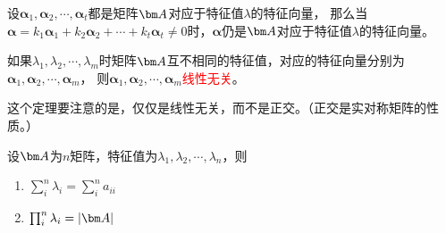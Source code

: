 \begin{theorem}
    设$\bm{\alpha}_1,\bm{\alpha}_2,\cdots,\bm{\alpha}_t$都是矩阵$\mat{A}$对应于特征值$\lambda$的特征向量，
    那么当$\bm{\alpha} = k_1\bm{\alpha}_1+k_2\bm{\alpha}_2 + \cdots + k_t\bm{\alpha}_t \neq 0$时，$\bm{\alpha}$仍是$\mat{A}$对应于特征值$\lambda$的特征向量。
\end{theorem}

\begin{theorem}
    如果$\lambda_1,\lambda_2,\cdots,\lambda_m$时矩阵$\mat{A}$互不相同的特征值，对应的特征向量分别为$\bm{\alpha}_1,\bm{\alpha}_2,\cdots,\bm{\alpha}_m$，
    则$\bm{\alpha}_1,\bm{\alpha}_2,\cdots,\bm{\alpha}_m$\textcolor{red}{线性无关}。
\end{theorem}
这个定理要注意的是，仅仅是线性无关，而不是正交。（正交是实对称矩阵的性质。）

\begin{theorem}
    设$\mat{A}$为$n$矩阵，特征值为$\lambda_1,\lambda_2,\cdots,\lambda_n$，则
    \begin{enumerate}
        \item $\sum_i^n \lambda_i = \sum_i^n a_{ii}$
        \item $\prod_i^n \lambda_i = |\mat{A}|$
    \end{enumerate}
\end{theorem}

